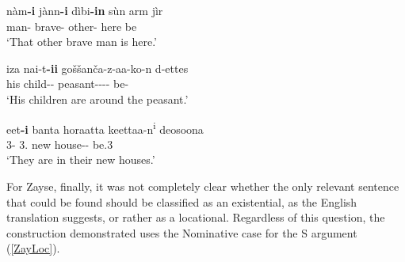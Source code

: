 \begin{exe}\ex\label{BorLoc} 
\gll n\`am\textbf{-i} j\`ann\textbf{-i} d\`ibi\textbf{-in} s\`un arm j\`ir \\
man-\nom{} brave-\nom{} other-\nom{} \dem{} here be\\
\glt `That other brave man is here.' 
\end{exe}

\begin{exe}\ex\label{GamLoc} 
 \gll iza na\textglotstop i-t\textbf{-ii} go\v s\v san\v ca-z-aa-ko-n d-ettes\\
his child-\pl{}-\nom{} peasant--\acc{}-\com{}-\loc{} be-\complx{}\\
\glt `His children are around the peasant.'
\end{exe}

\begin{exe}\ex\label{WolLoc} 
\gll eet\textbf{-i} banta horaatta keettaa-n\textsuperscript{i} de\textglotstop osoona\\
3\pl{}-\nom{} 3\pl{}.\poss{} new house-\pl{}-\loc{} be.3\pl{}\\
\glt `They are in their new houses.' 
\end{exe}

For Zayse, finally, it was not completely clear whether the only relevant sentence that could be found should be classified as an existential, as the English translation suggests, or rather as a locational. 
Regardless of this question, the construction demonstrated uses the Nominative case for the S argument (\ref{ZayLoc}). 

